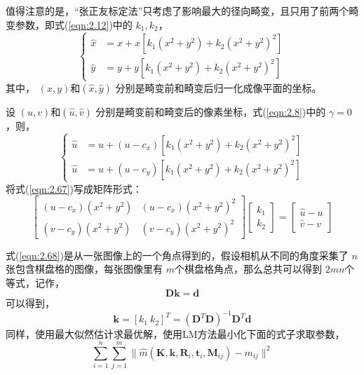 值得注意的是，“张正友标定法”只考虑了影响最大的径向畸变，且只用了前两个畸变参数，即式(\ref{eqn:2.12})中的 $k_1,k_2 $，
\begin{equation}
\label{eqn:2.66}
\left\{
\begin{aligned}
\hat{x} &= x + x[k_1(x^2 + y^2) + k_2(x^2 + y^2)^2] \\
\hat{y} &= y + y[k_1(x^2 + y^2) + k_2(x^2 + y^2)^2]
\end{aligned}
\right.
\end{equation}
其中， $(x,y)$和$(\hat{x},\hat{y}) $ 分别是畸变前和畸变后归一化成像平面的坐标。

设 $(u,v)$和$(\hat{u},\hat{v}) $ 分别是畸变前和畸变后的像素坐标，式(\ref{eqn:2.8})中的 $\gamma = 0 $ ，则，
\begin{equation}
\label{eqn:2.67}
\left\{
\begin{aligned}
\hat u &= u + (u-c_x)[k_1(x^2+y^2)+k_2(x^2+y^2)^2] \\
\hat u &= u + (u-c_y)[k_1(x^2+y^2)+k_2(x^2+y^2)^2]
\end{aligned}
\right.
\end{equation}
将式(\ref{eqn:2.67})写成矩阵形式：
\begin{equation}
\label{eqn:2.68}
\left[
\begin{array}{cc}
(u-c_x)(x^2+y^2) & (u-c_x)(x^2+y^2)^2 \\
(v-c_y)(x^2+y^2) & (v-c_y)(x^2+y^2)^2
\end{array}
\right]
\left[
\begin{array}{c}
k_1 \\ k_2
\end{array}
\right]=
\left[
\begin{array}{c}
\hat u -u \\ \hat v -v
\end{array}
\right]
\end{equation}

式(\ref{eqn:2.68})是从一张图像上的一个角点得到的，假设相机从不同的角度采集了 $n$ 张包含棋盘格的图像，每张图像里有 $m$个棋盘格角点，那么总共可以得到 $2mn$个等式，记作，
\begin{equation}
\label{eqn:2.69}
\bm{Dk} = \bm{d}
\end{equation}
可以得到，
\begin{equation}
\label{eqn:2.70}
\bm{k}=[k_1\ k_2]^T = (\bm{D}^T \bm{D})^{-1} \bm{D}^T\bm{d}
\end{equation}
同样，使用最大似然估计求最优解，使用LM方法最小化下面的式子求取参数，
\begin{equation}
\label{eqn:2.71}
\sum^n_{i=1}\sum^m_{j=1} \| \hat{m}( \bm{K},\bm{k},\bm{R}_i,\bm{t}_i,\bm{M}_{ij}  )-m_{ij} \|^2
\end{equation}

